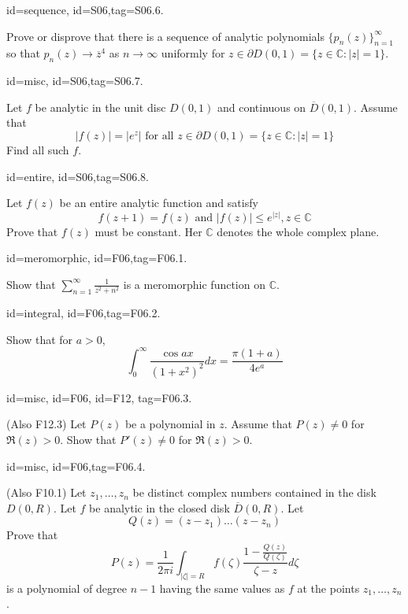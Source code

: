 \documentclass[12pt,letterpaper]{article}
\theoremstyle{plain}
\theoremstyle{definition}
\begin{document}
{\item[id=sequence, id=S06,tag=S06.6.]

Prove or disprove that there is a sequence of analytic polynomials $\{p_n(z)\}_{n=1}^{\infty}$ so that $p_n(z) \rightarrow \overline{z}^4$ as $n\rightarrow \infty$ uniformly for $z \in \partial D(0,1) = \{z \in \mathbb{C} \colon | z | = 1\}$.

\item[id=misc, id=S06,tag=S06.7.]

Let $f$ be analytic in the unit disc $D(0,1)$ and continuous on $\overline{D}(0,1)$. Assume that
\[
	| f(z) | = | e^z | \text{ for all } z \in \partial D(0,1) = \{z \in \mathbb{C} \colon | z | = 1\}
\]
Find all such $f$.

\item[id=entire, id=S06,tag=S06.8.]

Let $f(z)$ be an entire analytic function and satisfy
\[
	f(z+1) = f(z) \text{ and } | f(z) | \le e^{| z |}, z \in \mathbb{C}
\]
Prove that $f(z)$ must be constant. Her $\mathbb{C}$ denotes the whole complex plane.



\item[id=meromorphic, id=F06,tag=F06.1.]

Show that $\sum_{n=1}^{\infty} \frac{1}{z^2 + n^2}$ is a meromorphic function on $\mathbb{C}$.

\item[id=integral, id=F06,tag=F06.2.]

Show that for $a > 0$,
\[
	\int_{0}^{\infty} \frac{\cos ax}{(1+x^2)^2} dx = \frac{\pi(1+a)}{4e^a}
\]

\item[id=misc, id=F06, id=F12, tag=F06.3.]

(Also F12.3) Let $P(z)$ be a polynomial in $z$. Assume that $P(z) \ne 0$ for $\Re(z) > 0$. Show that $P'(z) \ne 0$ for $\Re(z) > 0$.

\item[id=misc, id=F06,tag=F06.4.]

(Also F10.1) Let $z_1,\ldots, z_n$ be distinct complex numbers contained in the disk $D(0,R)$. Let $f$ be analytic in the closed disk $\overline{D}(0,R)$. Let
\[
	Q(z) = (z - z_1)\ldots (z - z_n)
\]
Prove that
\[
	P(z) = \frac{1}{2 \pi i} \int_{| \zeta | = R} f(\zeta) \frac{1 - \frac{Q(z)}{Q(\zeta)}}{\zeta - z} d\zeta
\]
is a polynomial of degree $n - 1$ having the same values as $f$ at the points $z_1,\ldots, z_n$.

}
\end{document}
